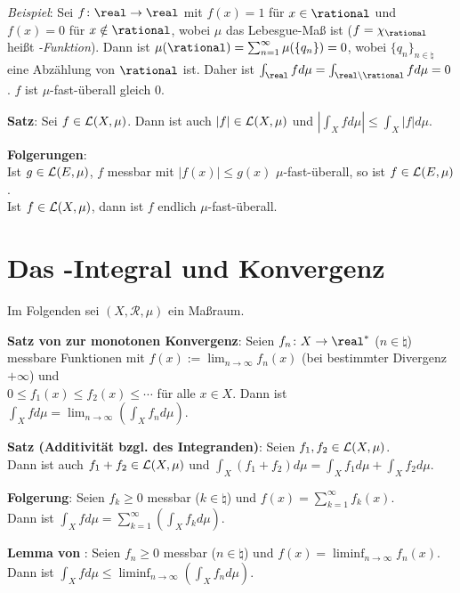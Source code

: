 \emph{Beispiel}:
Sei $f\colon \real \rightarrow \real$ mit $f(x) = 1$ für $x \in \rational$
und $f(x) = 0$ für $x \notin \rational$, wobei
$\mu$ das Lebesgue-Maß ist
($f = \chi_\rational$ heißt \emph{-Funktion}).
Dann ist $\mu(\rational) = \sum_{n=1}^\infty \mu(\{q_n\}) = 0$, wobei
$\{q_n\}_{n \in \natural}$ eine Abzählung von $\rational$ ist.
Daher ist $\int_\real f d\mu = \int_{\real \setminus \rational} f d\mu = 0$.
$f$ ist $\mu$-fast-überall gleich $0$.

\textbf{Satz}:
Sei $f \in \mathcal{L}(X, \mu)$.
Dann ist auch $|f| \in \mathcal{L}(X, \mu)$ und
$\left|\int_X f d\mu\right| \le \int_X |f| d\mu$.

\textbf{Folgerungen}: \\
Ist $g \in \mathcal{L}(E, \mu)$, $f$ messbar mit $|f(x)| \le g(x)$ $\mu$-fast-überall,
so ist $f \in \mathcal{L}(E, \mu)$. \\
Ist $f \in \mathcal{L}(X, \mu)$, dann ist $f$ endlich $\mu$-fast-überall.

\pagebreak

\section{%
    Das -Integral und Konvergenz%
}

Im Folgenden sei $(X, \mathcal{R}, \mu)$ ein Maßraum.

\textbf{Satz von  zur monotonen Konvergenz}:
Seien $f_n\colon X \rightarrow \real^\ast$ ($n \in \natural$)
messbare Funktionen mit
$f(x) := \lim_{n \to \infty} f_n(x)$
(bei bestimmter Divergenz $+\infty$) und \\
$0 \le f_1(x) \le f_2(x) \le \dotsb$ für alle $x \in X$.
Dann ist $\int_X f d\mu = \lim_{n \to \infty} \left(\int_X f_n d\mu\right)$.

\textbf{Satz (Additivität bzgl. des Integranden)}:
Seien $f_1, f_2 \in \mathcal{L}(X, \mu)$. \\
Dann ist auch $f_1 + f_2 \in \mathcal{L}(X, \mu)$ und
$\int_X (f_1 + f_2) d\mu = \int_X f_1 d\mu + \int_X f_2 d\mu$.

\textbf{Folgerung}:
Seien $f_k \ge 0$ messbar ($k \in \natural$)
und $f(x) = \sum_{k=1}^\infty f_k(x)$. \\
Dann ist $\int_X f d\mu = \sum_{k=1}^\infty \left(\int_X f_k d\mu\right)$.

\textbf{Lemma von }:
Seien $f_n \ge 0$ messbar ($n \in \natural$) und
$f(x) = \liminf_{n \to \infty} f_n(x)$. \\
Dann ist $\int_X f d\mu \le
\liminf_{n \to \infty} \left(\int_X f_n d\mu\right)$.


